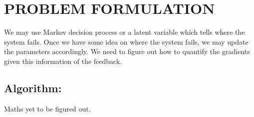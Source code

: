 

\section{PROBLEM FORMULATION}

We may use Markov decision process or a latent variable which tells where the
system fails. Once we have some idea on where the system fails, we may update
the parameters accordingly. 
We need to figure out how to quantify the gradients given this information of
the feedback.

\subsection{Algorithm:}
Maths yet to be figured out.

